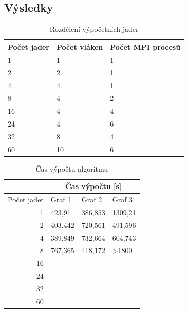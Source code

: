 \documentclass[czech]{article}
\begin{document}
\subsection{Výsledky}
\begin{table}[]
	\centering
	\caption{Rozdělení výpočetních jader}
	\label{cores-distribution}
	\begin{tabular}{|l||l|l|}
		\hline
		Počet jader & Počet vláken & Počet MPI procesů \\ \hline \hline
		1           & 1            & 1                 \\ \hline 
		2           & 2            & 1                 \\ \hline
		4           & 4            & 1                 \\ \hline
		8           & 4            & 2                 \\ \hline
		16          & 4            & 4                 \\ \hline
		24          & 4            & 6                 \\ \hline
		32          & 8            & 4                 \\ \hline
		60          & 10           & 6                 \\ \hline
	\end{tabular}
\end{table}

\begin{table}[]
	\centering
	\caption{Čas výpočtu algoritmu}
	\label{times-table}
	\begin{tabular}{|r||l|l|l|}
		\hline
		& \multicolumn{3}{c|}{Čas výpočtu {[}s{]}} \\ \hline \hline
		Počet jader & Graf 1    & Graf 2   & Graf 3            \\ \hline
		1           & 423,91    & 386,853  & 1309,21           \\
		2           & 403,442   & 720,561  & 491,596           \\
		4           & 389,849   & 732,664  & 604,743           \\
		8           & 767,365   & 418,172  & \textgreater1800  \\
		16          &           &          &                   \\
		24          &           &          &                   \\
		32          &           &          &                   \\
		60          &           &          &                   \\ \hline
	\end{tabular}
\end{table}
\end{document}
